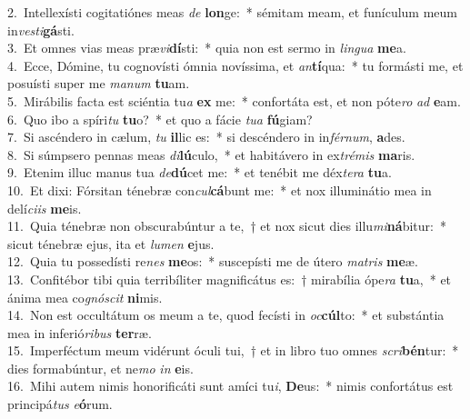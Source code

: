 {2.~}Intellexísti cogitatiónes meas \textit{de} \textbf{lon}ge:~* sémitam meam, et funículum meum in\textit{ve}\textit{sti}\textbf{gá}sti.\\
{3.~}Et omnes vias meas præ\textit{vi}\textbf{dí}sti:~* quia non est sermo in \textit{lin}\textit{gua} \textbf{me}a.\\
{4.~}Ecce, Dómine, tu cognovísti ómnia novíssima, et \textit{an}\textbf{tí}qua:~* tu formásti me, et posuísti super me \textit{ma}\textit{num} \textbf{tu}am.\\
{5.~}Mirábilis facta est sciéntia tu\textit{a} \textbf{ex} me:~* confortáta est, et non póte\textit{ro} \textit{ad} \textbf{e}am.\\
{6.~}Quo ibo a spíri\textit{tu} \textbf{tu}o?~* et quo a fácie \textit{tu}\textit{a} \textbf{fú}giam?\\
{7.~}Si ascéndero in cælum, \textit{tu} \textbf{il}lic es:~* si descéndero in in\textit{fér}\textit{num}, \textbf{a}des.\\
{8.~}Si súmpsero pennas meas \textit{di}\textbf{lú}culo,~* et habitávero in ex\textit{tré}\textit{mis} \textbf{ma}ris.\\
{9.~}Etenim illuc manus tua \textit{de}\textbf{dú}cet me:~* et tenébit me déx\textit{te}\textit{ra} \textbf{tu}a.\\
{10.~}Et dixi: Fórsitan ténebræ con\textit{cul}\textbf{cá}bunt me:~* et nox illuminátio mea in delí\textit{ci}\textit{is} \textbf{me}is.\\
{11.~}Quia ténebræ non obscurabúntur a te,~† et nox sicut dies illu\textit{mi}\textbf{ná}bitur:~* sicut ténebræ ejus, ita et \textit{lu}\textit{men} \textbf{e}jus.\\
{12.~}Quia tu possedísti re\textit{nes} \textbf{me}os:~* suscepísti me de útero \textit{ma}\textit{tris} \textbf{me}æ.\\
{13.~}Confitébor tibi quia terribíliter magnificátus es:~† mirabília ópe\textit{ra} \textbf{tu}a,~* et ánima mea co\textit{gnó}\textit{scit} \textbf{ni}mis.\\
{14.~}Non est occultátum os meum a te, quod fecísti in \textit{oc}\textbf{cúl}to:~* et substántia mea in inferió\textit{ri}\textit{bus} \textbf{ter}ræ.\\
{15.~}Imperféctum meum vidérunt óculi tui,~† et in libro tuo omnes \textit{scri}\textbf{bén}tur:~* dies formabúntur, et ne\textit{mo} \textit{in} \textbf{e}is.\\
{16.~}Mihi autem nimis honorificáti sunt amíci tu\textit{i}, \textbf{De}us:~* nimis confortátus est principá\textit{tus} \textit{e}\textbf{ó}rum.\\
